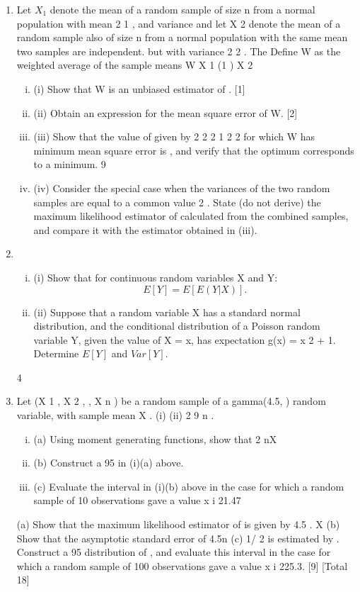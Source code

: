 \documentclass[a4paper,12pt]{article}
\begin{document}
\begin{enumerate}


\item Let $X_1$ denote the mean of a random sample of size n from a normal population with
mean
2
1 ,
and variance
and let X 2 denote the mean of a random sample also of
size n from a normal population with the same mean
two samples are independent.
but with variance
2
2 .
The
Define W as the weighted average of the sample means
W
X 1 (1
) X 2
\begin{enumerate}[(i)]
\item (i) Show that W is an unbiased estimator of . [1]
\item (ii) Obtain an expression for the mean square error of W. [2]
\item (iii) Show that the value of
given by
2
2
2
1
2
2
for which W has minimum mean square error is
,
and verify that the optimum corresponds to a minimum.
9
\item 
(iv) Consider the special case when the variances of the two random samples are
equal to a common value 2 . State (do not derive) the maximum likelihood
estimator of calculated from the combined samples, and compare it with the
estimator obtained in (iii).
\end{enumerate}

\item 

\begin{enumerate}[(i)]
\item (i) Show that for continuous random variables X and Y:
\[E[Y] = E[E(Y|X)].\]
\item (ii)
Suppose that a random variable X has a standard normal distribution, and the
conditional distribution of a Poisson random variable Y, given the value of
X = x, has expectation g(x) = x 2 + 1.
Determine $E[Y]$ and $Var[Y]$.
\end{enumerate}
4
\item %
Let (X 1 , X 2 ,
, X n ) be a random sample of a gamma(4.5, ) random variable, with
sample mean X .
(i)
(ii)
2
9 n .
\begin{enumerate}[(i)]
\item (a) Using moment generating functions, show that 2 nX ~
\item (b) Construct a 95%
in (i)(a) above.
\item (c) Evaluate the interval in (i)(b) above in the case for which a random
sample of 10 observations gave a value
x i 21.47
\end{enumerate}
(a) Show that the maximum likelihood estimator of
is given by
4.5
.
X
(b)
Show that the asymptotic standard error of
4.5n
(c)
1/ 2
is estimated by
.
Construct a 95%
distribution of , and evaluate this interval in the case for which a
random sample of 100 observations gave a value
x i 225.3.
[9]
[Total 18]


\end{enumerate}
\end{document}

